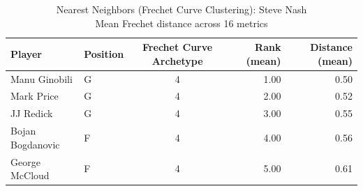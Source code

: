\begin{table}[t]
\caption*{
{\fontsize{20}{25} Nearest Neighbors (Frechet Curve Clustering): Steve Nash\fontsize{12}{15}\selectfont } \\ 
{\fontsize{14}{17}\selectfont  Mean Frechet distance across 16 metrics\fontsize{12}{15}\selectfont }
} 
\fontsize{12.0pt}{14.0pt}\selectfont
\begin{tabular*}{\linewidth}{@{\extracolsep{\fill}}llcrr}
\toprule
Player & Position & Frechet Curve Archetype & Rank (mean) & Distance (mean) \\ 
\midrule\addlinespace[2.5pt]
Manu Ginobili & G & 4 & 1.00 & 0.50 \\ 
Mark Price & G & 4 & 2.00 & 0.52 \\ 
JJ Redick & G & 4 & 3.00 & 0.55 \\ 
Bojan Bogdanovic & F & 4 & 4.00 & 0.56 \\ 
George McCloud & F & 4 & 5.00 & 0.61 \\ 
\bottomrule
\end{tabular*}
\end{table}


